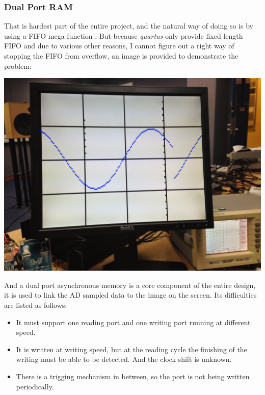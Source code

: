 \documentclass[11pt]{scrartcl}
\begin{document}
\subsubsection{Dual Port RAM}
\label{sec:duram}
That is hardest part of the entire project, and the natural way of doing so is by using a FIFO mega function \cite{fifo}. But because \textit{quartus} only provide fixed length FIFO and due to various other reasons, I cannot figure out a right way of stopping the FIFO from overflow, an image is provided to demonstrate the problem:


\begin{minipage}[t]{\linewidth}

{
\includegraphics[scale = 0.1]{IMG_1389.JPG}
}
\end{minipage}
\medskip

And a dual port asynchronous memory is a core component of the entire design, it is used to link the AD sampled data to the image on the screen. Its difficulties are listed as follows:
\begin{itemize}
    \item It must support one reading port and one writing port running at different speed.
    \item It is written at writing speed, but at the reading cycle the finishing of the writing must be able to be detected. And the clock shift is unknown. 
    \item There is a trigging mechanism in between, so the port is not being written periodically.
\end{itemize}
\end{document}
